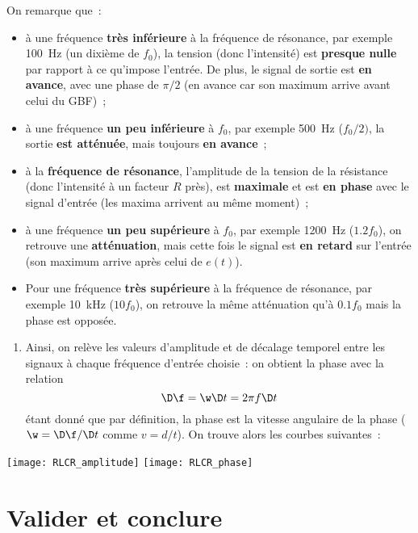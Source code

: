 \documentclass[a4paper, 11pt, final, garamond]{book}
\begin{document}
On remarque que~:
\begin{itemize}
    \item à une fréquence \textbf{très inférieure} à la fréquence de résonance,
        par exemple \SI{100}{Hz} (un dixième de $f_0$), la tension (donc
        l'intensité) est \textbf{presque nulle} par rapport à ce qu'impose
        l'entrée. De plus, le signal de sortie est \textbf{en avance}, avec
        une phase de $\pi/2$ (en avance car son maximum arrive avant celui du
        GBF)~;
    \item à une fréquence \textbf{un peu inférieure} à $f_0$, par exemple
        \SI{500}{Hz} ($f_0/2)$, la sortie \textbf{est atténuée}, mais toujours
        \textbf{en avance}~;
    \item à la \textbf{fréquence de résonance}, l'amplitude de la tension de la
        résistance (donc l'intensité à un facteur $R$ près), est
        \textbf{maximale} et est \textbf{en phase} avec le signal d'entrée (les
        maxima arrivent au même moment)~;
    \item à une fréquence \textbf{un peu supérieure} à $f_0$, par exemple
        \SI{1200}{Hz} ($\num{1.2}f_0$), on retrouve une \textbf{atténuation},
        mais cette fois le signal est \textbf{en retard} sur l'entrée (son
        maximum arrive après celui de $e(t)$).
    \item Pour une fréquence \textbf{très supérieure} à la fréquence de
        résonance, par exemple \SI{10}{kHz} ($10f_0$), on retrouve la même
        atténuation qu'à $\num{0.1}f_0$ mais la phase est opposée.
\end{itemize}

\begin{enumerate}[label=\sqenumi, start=4]
    \item Ainsi, on relève les valeurs d'amplitude et de décalage temporel entre
        les signaux à chaque fréquence d'entrée choisie~: on obtient la phase
        avec la relation
        \[\D\f = \w\D t =2\pi f\D t\]
        étant donné que par définition, la phase est la vitesse angulaire de la
        phase ($\w = \D\f/\D t$ comme $v = d/t$). On trouve alors les courbes
        suivantes~:
\end{enumerate}
\begin{center}
    \texttt{[image: RLCR\_amplitude]}
    \hfill
    \texttt{[image: RLCR\_phase]}
\end{center}

\section{Valider et conclure}
\end{document}
